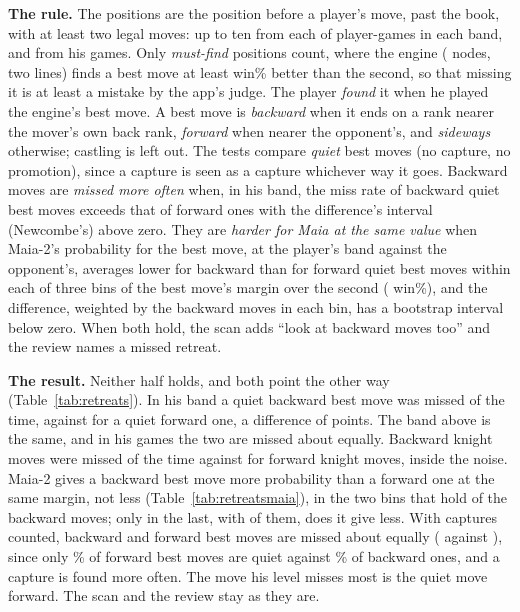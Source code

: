 \documentclass[11pt]{article}
\begin{document}
\textbf{The rule.} The positions are the position before a player's move, past the book, with at
least two legal moves: up to ten from each of \RetreatsDrawGames{} player-games in each band, and
\RetreatsDrawArchive{} from his games. Only \emph{must-find} positions count, where the engine
(\CheckNodes{} nodes, two lines) finds a best move at least \RetreatsMustFind{} win\% better than the
second, so that missing it is at least a mistake by the app's judge. The player \emph{found} it when
he played the engine's best move. A best move is \emph{backward} when it ends on a rank nearer the
mover's own back rank, \emph{forward} when nearer the opponent's, and \emph{sideways} otherwise;
castling is left out. The tests compare \emph{quiet} best moves (no capture, no promotion), since a
capture is seen as a capture whichever way it goes. Backward moves are \emph{missed more often} when,
in his band, the miss rate of backward quiet best moves exceeds that of forward ones with the
difference's interval (Newcombe's) above zero. They are \emph{harder for Maia at the same value} when
Maia-2's probability for the best move, at the player's band against the opponent's, averages lower
for backward than for forward quiet best moves within each of three bins of the best move's margin
over the second (\RetreatsBins{} win\%), and the difference, weighted by the backward moves in each
bin, has a bootstrap interval below zero. When both hold, the scan adds ``look at backward moves
too'' and the review names a missed retreat.

\textbf{The result.} Neither half holds, and both point the other way (Table~\ref{tab:retreats}). In
his band a quiet backward best move was missed \RetreatsHisBackward{} of the time, against
\RetreatsHisForward{} for a quiet forward one, a difference of \RetreatsHisDiff{} points. The band
above is the same, and in his games the two are missed about equally. Backward knight moves were
missed \RetreatsHisKnightBack{} of the time against \RetreatsHisKnightFwd{} for forward knight moves,
inside the noise. Maia-2 gives a backward best move more probability than a forward one at the same
margin, not less (Table~\ref{tab:retreatsmaia}), in the two bins that hold
\RetreatsFirstBinsBackward{} of the \RetreatsHisQuietBackward{} backward moves; only in the last,
with \RetreatsLastBinBackward{} of them, does it give less. With captures counted, backward and
forward best moves are missed about equally (\RetreatsHisAllBackward{} against
\RetreatsHisAllForward), since only \RetreatsFwdQuietShare\% of forward best moves are quiet against
\RetreatsBackQuietShare\% of backward ones, and a capture is found more often. The move his level
misses most is the quiet move forward. The scan and the review stay as they are.
\end{document}
